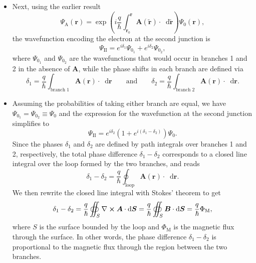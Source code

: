 \documentclass[11pt, a4paper]{article}
\newcommand{\diff}{\mathop{}\!\mathrm{d}} %
\renewcommand{\curl}{\nabla \cross}
\newcommand{\eqtext}[1]{\qquad \text{#1} \qquad}
\renewcommand{\vec}[1]{\bm{#1}}  %
\renewcommand{\t}[1]{\tilde{#1}}
\renewcommand{\r}{\vec{r}}  %
\newcommand{\A}{\vec{A}}  %
\newcommand{\B}{\vec{B}}  %
\renewcommand{\P}{\Psi}  %
\begin{document}
\begin{itemize}
    \item Next, using the earlier result
    \begin{equation*}
		\P_{\text{A}}(\r) = \exp\left(i\frac{q}{\hbar} \int_{\r_{0}}^{\r}\A(\t{\r})\cdot \diff\t{\r}\right) \P_{0}(\r),
    \end{equation*}
	the wavefunction encoding the electron at the second junction is
	\begin{equation*}
		\P_{\text{II}} = e^{i\delta_{1}} \P_{0_{1}} + e^{i\delta_{2}}\P_{0_{2}},
	\end{equation*}
	where $ \P_{0_{1}} $ and $ \P_{0_{2}} $ are the wavefunctions that would occur in branches 1 and 2 in the absence of $ \A $, while the phase shifts in each branch are defined via
	\begin{equation*}
		\delta_{1} = \frac{q}{\hbar} \int_{\text{branch 1}} \A(\r) \cdot \diff \r \eqtext{and} \delta_{2} = \frac{q}{\hbar} \int_{\text{branch 2}} \A(\r) \cdot \diff \r.
	\end{equation*}
	
	\item Assuming the probabilities of taking either branch are equal, we have $ \P_{0_{1}} = \P_{0_{2}} \equiv \P_{0} $ and the expression for the wavefunction at the second junction simplifies to
	\begin{equation*}
		\P_{\text{II}} = e^{i\delta_{2}}\left(1 + e^{i(\delta_{1} - \delta_{2})}\right)\P_{0}.
	\end{equation*}
	Since the phases $ \delta_{1} $ and $\delta_{2} $ are defined by path integrals over branches 1 and 2, respectively, the total phase difference $ \delta_{1} - \delta_{2} $ corresponds to a closed line integral over the loop formed by the two branches, and reads
	\begin{equation*}
		\delta_{1} - \delta_{2} = \frac{q}{\hbar} \oint_{\text{loop}} \A(\r) \cdot \diff \r.
	\end{equation*}
	We then rewrite the closed line integral with Stokes' theorem to get
	\begin{equation*}
		\delta_{1} - \delta_{2} = \frac{q}{\hbar} \oiint_{S}\curl \A \cdot \diff \vec{S} = \frac{q}{\hbar}\oiint_{S} \B \cdot \diff \vec{S} = \frac{q}{\hbar}\Phi_{\text{M}},
	\end{equation*}
	where $ S $ is the surface bounded by the loop and $ \Phi_{\text{M}} $ is the magnetic flux through the surface. In other words, the phase difference $ \delta_{1} - \delta_{2} $ is proportional to the magnetic flux through the region between the two branches.
	

\end{itemize}
\end{document}
